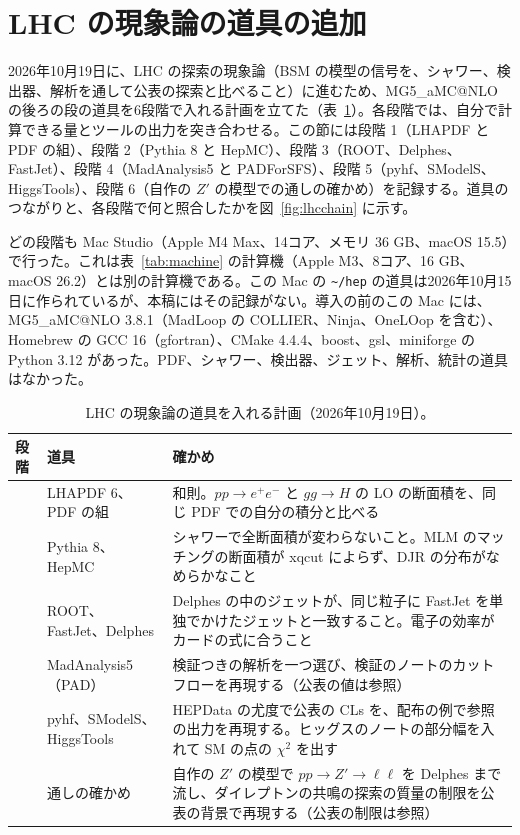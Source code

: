\documentclass[a4paper,10pt]{ltjsarticle}
\makeatletter
\newcommand{\MGaMC}{MG5\_aMC@NLO}
\newcommand{\pth}[1]{\texttt{\textasciitilde/}\nolinkurl{#1}}
\makeatother
\begin{document}
\section{LHC の現象論の道具の追加}\label{sec:lhc}

2026年10月19日に、LHC の探索の現象論（BSM の模型の信号を、シャワー、検出器、解析を通して公表の探索と比べること）に進むため、\MGaMC{} の後ろの段の道具を6段階で入れる計画を立てた（表~\ref{tab:lhcplan}）。各段階では、自分で計算できる量とツールの出力を突き合わせる。この節には段階 1（LHAPDF と PDF の組）、段階 2（Pythia 8 と HepMC）、段階 3（ROOT、Delphes、FastJet）、段階 4（MadAnalysis5 と PADForSFS）、段階 5（pyhf、SModelS、HiggsTools）、段階 6（自作の $Z'$ の模型での通しの確かめ）を記録する。道具のつながりと、各段階で何と照合したかを図~\ref{fig:lhcchain} に示す。

どの段階も Mac Studio（Apple M4 Max、14コア、メモリ 36 GB、macOS 15.5）で行った。これは表~\ref{tab:machine} の計算機（Apple M3、8コア、16 GB、macOS 26.2）とは別の計算機である。この Mac の \pth{hep} の道具は2026年10月15日に作られているが、本稿にはその記録がない。導入の前のこの Mac には、\MGaMC{} 3.8.1（MadLoop の COLLIER、Ninja、OneLOop を含む）、Homebrew の GCC 16（gfortran）、CMake 4.4.4、boost、gsl、miniforge の Python 3.12 があった。PDF、シャワー、検出器、ジェット、解析、統計の道具はなかった。

\begin{table}[htbp]
\centering\small
\caption{LHC の現象論の道具を入れる計画（2026年10月19日）。}
\label{tab:lhcplan}
\begin{tabularx}{\linewidth}{>{\raggedright\arraybackslash}p{0.9cm}>{\raggedright\arraybackslash}p{3.2cm}X}
\toprule
\textbf{段階} & \textbf{道具} & \textbf{確かめ} \\
\midrule
1 & LHAPDF 6、PDF の組 & 和則。$pp\to e^+e^-$ と $gg\to H$ の LO の断面積を、同じ PDF での自分の積分と比べる \\
2 & Pythia 8、HepMC & シャワーで全断面積が変わらないこと。MLM のマッチングの断面積が xqcut によらず、DJR の分布がなめらかなこと \\
3 & ROOT、FastJet、Delphes & Delphes の中のジェットが、同じ粒子に FastJet を単独でかけたジェットと一致すること。電子の効率がカードの式に合うこと \\
4 & MadAnalysis5（PAD） & 検証つきの解析を一つ選び、検証のノートのカットフローを再現する（公表の値は参照） \\
5 & pyhf、SModelS、HiggsTools & HEPData の尤度で公表の CLs を、配布の例で参照の出力を再現する。ヒッグスのノートの部分幅を入れて SM の点の $\chi^2$ を出す \\
6 & 通しの確かめ & 自作の $Z'$ の模型で $pp\to Z'\to\ell\ell$ を Delphes まで流し、ダイレプトンの共鳴の探索の質量の制限を公表の背景で再現する（公表の制限は参照） \\
\bottomrule
\end{tabularx}
\end{table}
\end{document}
